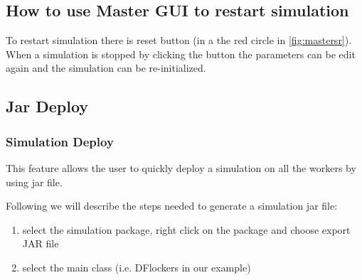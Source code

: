 \documentclass{article}
\begin{document}
\subsection{How to use Master GUI to restart simulation}
To restart simulation there is reset button (in a the red circle in \ref{fig:mastersr}). When a simulation is stopped by clicking the button the parameters can be edit again and the simulation can be re-initialized.
\begin{figure}[h]
\end{figure}

\subsection{Jar Deploy}
\subsubsection{Simulation Deploy}
This feature allows the user to quickly deploy a simulation on all the workers by using jar file.\\
\begin{figure}[h]
\end{figure}
Following we will describe the steps needed to generate a simulation jar file:
\begin{enumerate} 
  \item select the simulation package, right click on the package and choose export JAR file
  \item select the main class (i.e. DFlockers in our example)
\end{enumerate}
\end{document}
